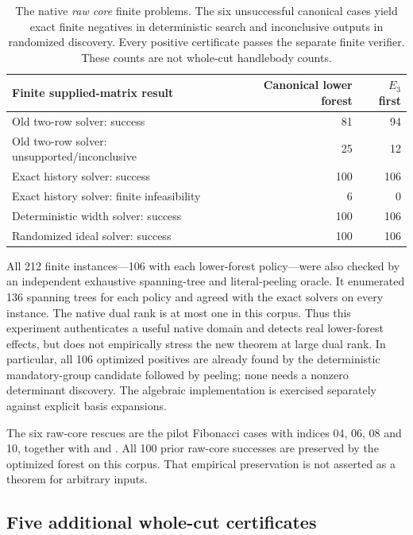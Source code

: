 \begin{table}[htbp]
\centering
\begin{tabular}{lrr}
\toprule
Finite supplied-matrix result & Canonical lower forest & $E_3$ first\\
\midrule
Old two-row solver: success & 81 & 94\\
Old two-row solver: unsupported/inconclusive & 25 & 12\\
Exact history solver: success & 100 & 106\\
Exact history solver: finite infeasibility & 6 & 0\\
Deterministic width solver: success & 100 & 106\\
Randomized ideal solver: success & 100 & 106\\
\bottomrule
\end{tabular}
\caption{The native \emph{raw core} finite problems.  The six unsuccessful
canonical cases yield exact finite negatives in deterministic search and
inconclusive outputs in randomized discovery.  Every positive certificate
passes the separate finite verifier.  These counts are not whole-cut
handlebody counts.}
\label{tab:finite-core}
\end{table}

All 212 finite instances---106 with each lower-forest policy---were also
checked by an independent exhaustive spanning-tree and literal-peeling
oracle.  It enumerated 136 spanning trees for each policy and agreed with
the exact solvers on every instance.  The native dual rank is at most one
in this corpus.  Thus this experiment authenticates a useful native domain
and detects real lower-forest effects, but does not empirically stress the
new theorem at large dual rank.  In particular, all 106 optimized positives
are already found by the deterministic mandatory-group candidate followed
by peeling; none needs a nonzero determinant discovery.  The algebraic
implementation is exercised separately against explicit basis expansions.

The six raw-core rescues are the pilot Fibonacci cases with indices
04, 06, 08 and 10, together with  and
.
All 100 prior raw-core successes are preserved by the optimized forest on
this corpus.  That empirical preservation is not asserted as a theorem
for arbitrary inputs.

\subsection{Five additional whole-cut certificates}

